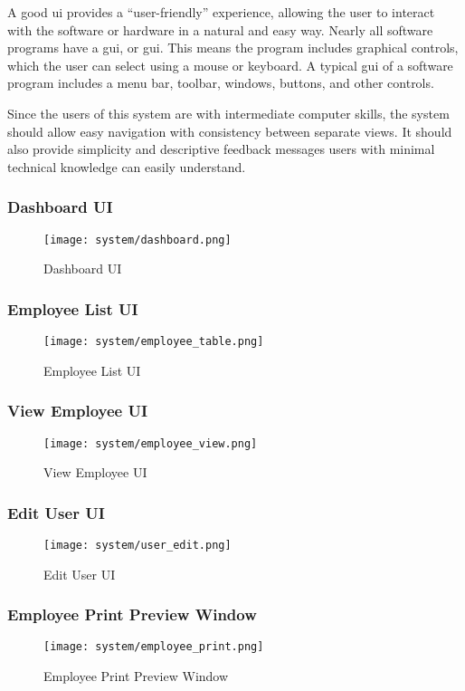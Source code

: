 \documentclass[12pt]{report}
\begin{document}
A good \acrshort{ui} provides a ``user-friendly'' experience, allowing the user to interact with the software or hardware in a natural and easy way. Nearly all software programs have a \acrlong{gui}, or \acrshort{gui}. This means the program includes graphical controls, which the user can select using a mouse or
keyboard. A typical \acrshort{gui} of a software program includes a menu bar, toolbar, windows, buttons, and other controls.

Since the users of this system are with intermediate computer skills, the system should allow easy navigation with consistency between separate views. It should also provide simplicity and descriptive feedback messages users with minimal technical knowledge can easily understand.

\subsubsection{Dashboard UI}
\begin{figure}[H]
	\centering
	\texttt{[image: system/dashboard.png]}
	\caption{Dashboard UI}
\end{figure}

\subsubsection{Employee List UI}
\begin{figure}[H]
	\centering
	\texttt{[image: system/employee\_table.png]}
	\caption{Employee List UI}
\end{figure}

\subsubsection{View Employee UI}
\begin{figure}[H]
	\centering
	\texttt{[image: system/employee\_view.png]}
	\caption{View Employee UI}
\end{figure}

\subsubsection{Edit User UI}
\begin{figure}[H]
	\centering
	\texttt{[image: system/user\_edit.png]}
	\caption{Edit User UI}
\end{figure}

\subsubsection{Employee Print Preview Window}
\begin{figure}[H]
	\centering
	\texttt{[image: system/employee\_print.png]}
	\caption{Employee Print Preview Window}
\end{figure}


\singlespacing
\printbibliography[title={References}]
\end{document}
